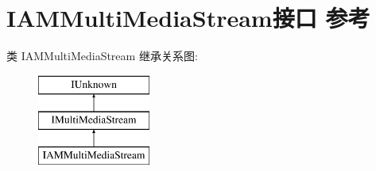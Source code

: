 \hypertarget{interface_i_a_m_multi_media_stream}{}\section{I\+A\+M\+Multi\+Media\+Stream接口 参考}
\label{interface_i_a_m_multi_media_stream}
类 I\+A\+M\+Multi\+Media\+Stream 继承关系图\+:\begin{figure}[H]
\begin{center}
\leavevmode
\includegraphics[height=3.000000cm]{interface_i_a_m_multi_media_stream}
\end{center}
\end{figure}
